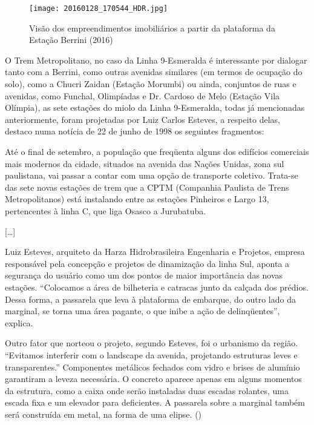 \documentclass[11pt,fleqn]{book} %
\begin{document}
\begin{figure}[h]
	\caption{Visão dos empreendimentos imobiliários a partir da plataforma da Estação Berrini (2016)}
	\texttt{[image: 20160128\_170544\_HDR.jpg]}
\end{figure}

O Trem Metropolitano, no caso da Linha 9-Esmeralda é interessante por dialogar tanto com a Berrini, como outras avenidas similares (em termos de ocupação do solo), como a Chucri Zaidan (Estação Morumbi) ou ainda, conjuntos de ruas e avenidas, como Funchal, Olimpíadas e Dr. Cardoso de Melo (Estação Vila Olímpia), as sete estações do miolo da Linha 9-Esmeralda, todas já mencionadas anteriormente, foram projetadas por Luiz Carlos Esteves, a respeito delas, destaco numa notícia de 22 de junho de 1998 os seguintes fragmentos:

\begin{citacao}
	Até o final de setembro, a população que freqüenta alguns dos edifícios comerciais mais modernos da cidade, situados na avenida das Nações Unidas, zona sul paulistana, vai passar a contar com uma opção de transporte coletivo. Trata-se das sete novas estações de trem que a CPTM (Companhia Paulista de Trens Metropolitanos) está instalando entre as estações Pinheiros e Largo 13, pertencentes à linha C, que liga Osasco a Jurubatuba.
	
	[\dots]
	
	Luiz Esteves, arquiteto da Harza Hidrobrasileira Engenharia e Projetos, empresa responsável pela concepção e projetos de dinamização da linha Sul, aponta a segurança do usuário como um dos pontos de maior importância das novas estações. “Colocamos a área de bilheteria e catracas junto da calçada dos prédios. Dessa forma, a passarela que leva à plataforma de embarque, do outro lado da marginal, se torna uma área pagante, o que inibe a ação de delinqüentes”, explica.
	
	Outro fator que norteou o projeto, segundo Esteves, foi o urbanismo da região. “Evitamos interferir com o landscape da avenida, projetando estruturas leves e transparentes.” Componentes metálicos fechados com vidro e brises de alumínio garantiram a leveza necessária. O concreto aparece apenas em alguns momentos da estrutura, como a caixa onde serão instaladas duas escadas rolantes, uma escada fixa e um elevador para deficientes. A passarela sobre a marginal também será construída em metal, na forma de uma elipse.
	(\cite{trembom})
\end{citacao}
\end{document}
